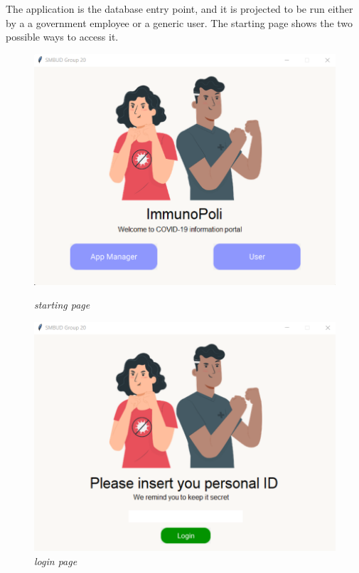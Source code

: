 The application is the database entry point, and it is projected to be run either by a a government employee or a generic user. The starting page shows the two possible ways to access it.
\begin{figure}[h]
    \centering
    \begin{minipage}{0.475\textwidth}
        \centering
        \includegraphics[width=\textwidth]{images/starting_page.png} 
        \caption{\textit{starting page}}
        \label{figure 2}
    \end{minipage}\hfill
    \begin{minipage}{0.475\textwidth}
        \centering
        \includegraphics[width=\textwidth]{images/login_page.png} 
        \caption{\textit{login page}}
        \label{figure 3}
    \end{minipage}
\end{figure}
